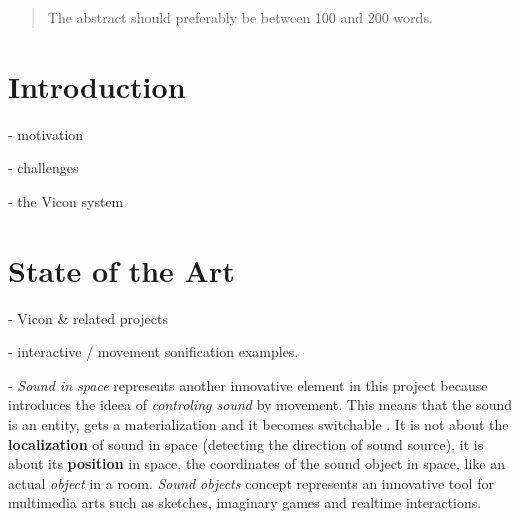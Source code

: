 \documentclass{nime-alternate}
\begin{document}
\date{20 Jan 2017}

\maketitle
\begin{abstract}

The abstract should preferably be between 100 and 200 words.
\end{abstract}






\section{Introduction}

- motivation

- challenges

- the Vicon system

\section{State of the Art}

- Vicon \& related projects

- interactive / movement sonification examples\cite{hermann2011sonification}.

- \textit{Sound in space} represents another innovative element in this project because introduces the ideea of \textit{controling sound} by movement.
This means that the sound is an entity, gets a materialization and it becomes switchable \cite{soundunseen}. It is not about the \textbf{localization} of sound in space (detecting the direction of sound source), it is about its \textbf{position} in space, the coordinates of the sound object in space, like an actual \textit{object} in a room. \textit{Sound objects} concept represents an innovative tool for multimedia arts such as sketches, imaginary games and realtime interactions.
\end{document}
